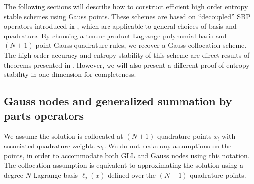 \documentclass[review,onefignum,onetabnum,final]{siamart171218}
\begin{document}
The following sections will describe how to construct efficient high order entropy stable schemes using Gauss points.  These schemes are based on ``decoupled'' SBP operators introduced in \cite{chan2017discretely, chan2018discretely}, which are applicable to general choices of basis and quadrature.  By choosing a tensor product Lagrange polynomial basis and $(N+1)$ point Gauss quadrature rules, we recover a Gauss collocation scheme.  The high order accuracy and entropy stability of this scheme are direct results of theorems presented in  \cite{chan2017discretely, chan2018discretely}.  However, we will also present a different proof of entropy stability in one dimension for completeness.  

\subsection{Gauss nodes and generalized summation by parts operators}
\label{sec:gsbp}
We assume the solution is collocated at $(N+1)$ quadrature points $x_i$ with associated quadrature weights $w_i$.  We do not make any assumptions on the points, in order to accommodate both GLL and Gauss nodes using this notation.  The collocation assumption is equivalent to approximating the solution using a degree $N$ Lagrange basis $\ell_j(x)$ defined over the $(N+1)$ quadrature points.  
\end{document}
